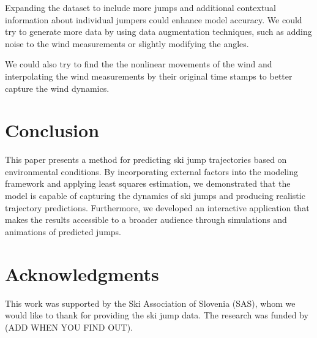 \documentclass[sigconf,natbib=false, language=english]{acmart}
\begin{document}
Expanding the dataset to include more jumps and additional contextual 
information about individual jumpers could enhance model accuracy. We could
try to generate more data by using data augmentation techniques, such as adding noise
to the wind measurements or slightly modifying the angles. 

We could also try to find the the nonlinear movements of the wind and interpolating
the wind measurements by their original time stamps to better capture the wind dynamics.


\section{Conclusion}\label{sec:conclusion}

This paper presents a method for predicting ski jump trajectories based on 
environmental conditions. By incorporating external factors into the modeling 
framework and applying least squares estimation, we demonstrated that the model 
is capable of capturing the dynamics of ski jumps and producing realistic 
trajectory predictions. Furthermore, we developed an interactive application 
that makes the results accessible to a broader audience through simulations and 
animations of predicted jumps.

\section{Acknowledgments}
This work was supported by the Ski Association of Slovenia (SAS), whom we would like to thank
for providing the ski jump data. The research was funded by (ADD WHEN YOU FIND OUT). 

\printbibliography

\appendix
\end{document}
